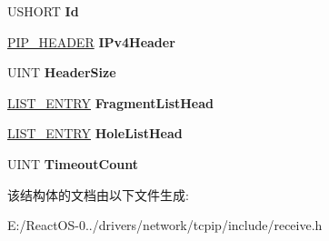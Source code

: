 \begin{DoxyCompactItemize}
\mbox{\label{struct_i_p_d_a_t_a_g_r_a_m___r_e_a_s_s_e_m_b_l_y_a8ebe780d7912d556c9176835be1a2a04}} 
U\+S\+H\+O\+RT {\bfseries Id}
\item 
\mbox{\label{struct_i_p_d_a_t_a_g_r_a_m___r_e_a_s_s_e_m_b_l_y_a490d9daf1496176c568aab66f33e9a00}} 
\hyperlink{union___i_p___h_e_a_d_e_r}{P\+I\+P\+\_\+\+H\+E\+A\+D\+ER} {\bfseries I\+Pv4\+Header}
\item 
\mbox{\label{struct_i_p_d_a_t_a_g_r_a_m___r_e_a_s_s_e_m_b_l_y_a8eb9dbbe1b684d58f25ea0456f861e28}} 
U\+I\+NT {\bfseries Header\+Size}
\item 
\mbox{\label{struct_i_p_d_a_t_a_g_r_a_m___r_e_a_s_s_e_m_b_l_y_a5d1b802698c00c2aa2e4286de6de2a42}} 
\hyperlink{struct___l_i_s_t___e_n_t_r_y}{L\+I\+S\+T\+\_\+\+E\+N\+T\+RY} {\bfseries Fragment\+List\+Head}
\item 
\mbox{\label{struct_i_p_d_a_t_a_g_r_a_m___r_e_a_s_s_e_m_b_l_y_ad01a948b742aac00e4d3767d6c0f383d}} 
\hyperlink{struct___l_i_s_t___e_n_t_r_y}{L\+I\+S\+T\+\_\+\+E\+N\+T\+RY} {\bfseries Hole\+List\+Head}
\item 
\mbox{\label{struct_i_p_d_a_t_a_g_r_a_m___r_e_a_s_s_e_m_b_l_y_a2a5c385a5c8aa7e28d88cf5148a86229}} 
U\+I\+NT {\bfseries Timeout\+Count}
\end{DoxyCompactItemize}


该结构体的文档由以下文件生成\+:\begin{DoxyCompactItemize}
\item 
E\+:/\+React\+O\+S-\/0../drivers/network/tcpip/include/receive.\+h\end{DoxyCompactItemize}
